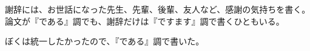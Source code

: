 \begin{acknowledgment}

謝辞には、お世話になった先生、先輩、後輩、友人など、感謝の気持ちを書く。論文が『である』調でも、謝辞だけは『ですます』調で書くひともいる。

ぼくは統一したかったので、『である』調で書いた。

\end{acknowledgment}
